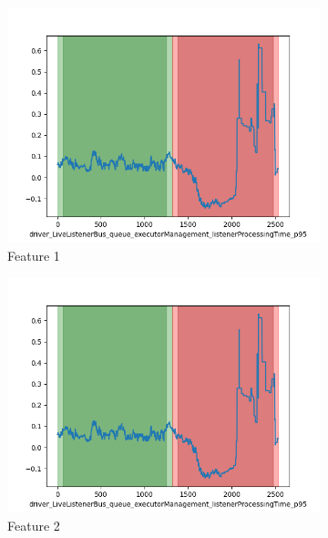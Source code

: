 \documentclass[oneside, a4paper, onecolumn, 11pt]{article}
\begin{document}
\begin{figure}[H]
  \centering
  \begin{subfigure}{0.30\textwidth}
      \centering
      \includegraphics[width=\linewidth]{images/plotduo1111.png}
      \caption{Feature 1}
  \end{subfigure}
  \begin{subfigure}{0.30\textwidth}
      \centering
      \includegraphics[width=\linewidth]{images/plotduo1111.png}
      \caption{Feature 2}
  \end{subfigure}
  \begin{subfigure}{0.30\textwidth}
    \centering

\end{subfigure}
\end{figure}
\end{document}
